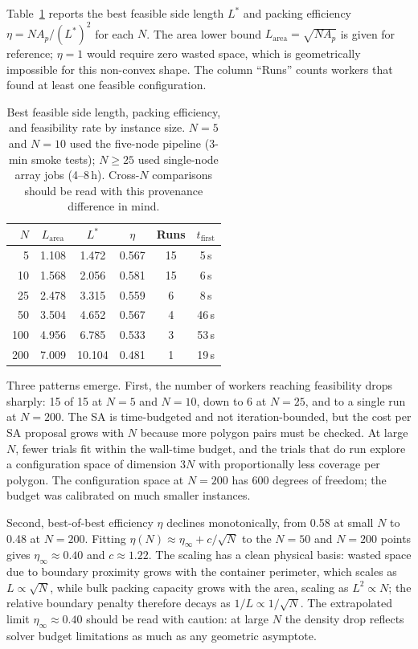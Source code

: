 \documentclass[10pt,twocolumn]{article}
\begin{document}
Table~\ref{tab:results} reports the best feasible side length $L^*$
and packing efficiency $\eta = N A_p / (L^*)^2$ for each $N$. The
area lower bound $L_{\mathrm{area}} = \sqrt{N A_p}$ is given for
reference; $\eta = 1$ would require zero wasted space, which is
geometrically impossible for this non-convex shape. The column
``Runs'' counts workers that found at least one feasible configuration.

\begin{table}[h]
\centering\small
\setlength{\tabcolsep}{3.5pt}
\caption{Best feasible side length, packing efficiency, and
feasibility rate by instance size. $N = 5$ and $N = 10$ used the
five-node pipeline (3-min smoke tests); $N \geq 25$ used single-node
array jobs (4--8\,h). Cross-$N$ comparisons should be read with this
provenance difference in mind.}
\label{tab:results}
\begin{tabular}{r@{\hskip6pt}ccccc}
\toprule
$N$ & $L_{\mathrm{area}}$ & $L^*$ & $\eta$ & Runs &
$t_{\mathrm{first}}$ \\
\midrule
  5 & 1.108 & 1.472 & 0.567 & 15 &  5\,s \\
 10 & 1.568 & 2.056 & 0.581 & 15 &  6\,s \\
 25 & 2.478 & 3.315 & 0.559 &  6 &  8\,s \\
 50 & 3.504 & 4.652 & 0.567 &  4 & 46\,s \\
100 & 4.956 & 6.785 & 0.533 &  3 & 53\,s \\
200 & 7.009 & 10.104& 0.481 &  1 & 19\,s \\
\bottomrule
\end{tabular}
\end{table}

Three patterns emerge. First, the number of workers reaching
feasibility drops sharply: 15 of 15 at $N = 5$ and $N = 10$, down to
6 at $N = 25$, and to a single run at $N = 200$. The SA is
time-budgeted and not iteration-bounded, but the cost per SA proposal
grows with $N$ because more polygon pairs must be checked. At large
$N$, fewer trials fit within the wall-time budget, and the trials that
do run explore a configuration space of dimension $3N$ with
proportionally less coverage per polygon. The configuration space at
$N = 200$ has 600 degrees of freedom; the budget was calibrated on
much smaller instances.

Second, best-of-best efficiency $\eta$ declines monotonically, from
0.58 at small $N$ to 0.48 at $N = 200$. Fitting $\eta(N) \approx
\eta_\infty + c/\!\sqrt{N}$ to the $N = 50$ and $N = 200$ points
gives $\eta_\infty \approx 0.40$ and $c \approx 1.22$. The scaling
has a clean physical basis: wasted space due to boundary proximity
grows with the container perimeter, which scales as $L \propto
\sqrt{N}$, while bulk packing capacity grows with the area, scaling
as $L^2 \propto N$; the relative boundary penalty therefore decays as
$1/L \propto 1/\!\sqrt{N}$. The extrapolated limit $\eta_\infty
\approx 0.40$ should be read with caution: at large $N$ the density
drop reflects solver budget limitations as much as any geometric
asymptote.
\end{document}
